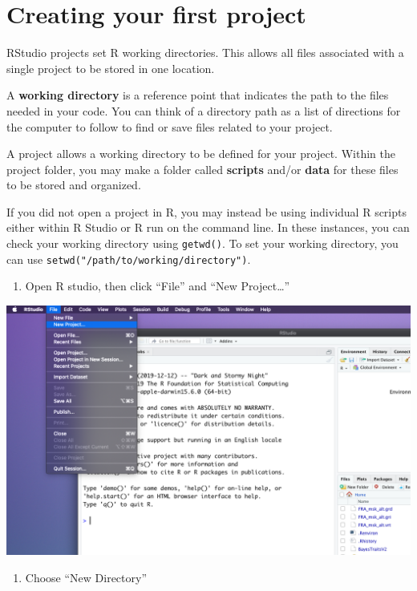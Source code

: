 \documentclass[
]{book}
\providecommand{\tightlist}{%
  \setlength{\itemsep}{0pt}\setlength{\parskip}{0pt}}
\begin{document}
\hypertarget{creating-your-first-project}{%
\section{Creating your first project}\label{creating-your-first-project}}

RStudio projects set R working directories. This allows all files associated with a single project to be stored in one location.

A \textbf{working directory} is a reference point that indicates the path to the files needed in your code. You can think of a directory path as a list of directions for the computer to follow to find or save files related to your project.

A project allows a working directory to be defined for your project. Within the project folder, you may make a folder called \textbf{scripts} and/or \textbf{data} for these files to be stored and organized.

If you did not open a project in R, you may instead be using individual R scripts either within R Studio or R run on the command line. In these instances, you can check your working directory using \texttt{getwd()}. To set your working directory, you can use \texttt{setwd("/path/to/working/directory")}.

\begin{enumerate}
\def\labelenumi{\arabic{enumi}.}
\tightlist
\item
  Open R studio, then click ``File'' and ``New Project\ldots{}''
\end{enumerate}

\begin{center}\includegraphics[width=0.7\linewidth]{img/Project1} \end{center}

\begin{enumerate}
\def\labelenumi{\arabic{enumi}.}
\setcounter{enumi}{1}
\tightlist
\item
  Choose ``New Directory''
\end{enumerate}
\end{document}
